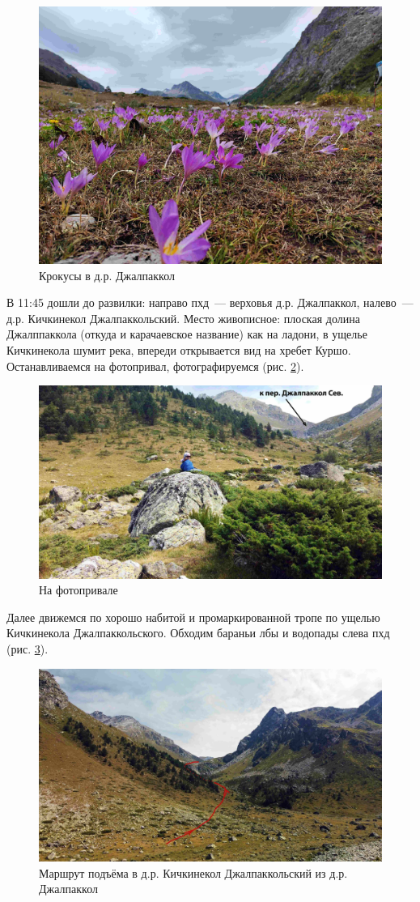 \begin{figure}[h!]
	\centering
	\includegraphics[width=0.7\linewidth]{../pics/IMG_20240822_101505}
	\caption{Крокусы в д.р. Джалпаккол}
	\label{fig:IMG_20240822_101505}
\end{figure}

В 11:45 дошли до развилки: направо пхд~--- верховья д.р. Джалпаккол, налево~--- д.р. Кичкинекол Джалпаккольский. Место живописное: плоская долина Джалппаккола (откуда и карачаевское название) как на ладони, в ущелье Кичкинекола шумит река, впереди открывается вид на хребет Куршо. Останавливаемся на фотопривал, фотографируемся (рис. \ref{fig:DJI_0830}).

\begin{figure}[h!]
	\centering
	\includegraphics[width=0.7\linewidth]{../pics/DJI_0830}
	\caption{На фотопривале}
	\label{fig:DJI_0830}
\end{figure}

Далее движемся по хорошо набитой и промаркированной тропе по ущелью Кичкинекола Джалпаккольского. Обходим бараньи лбы и водопады слева пхд (рис. \ref{fig:DJI_0835}).


\begin{figure}[h!]
	\centering
	\includegraphics[width=0.7\linewidth]{../pics/DJI_0835}
	\caption{Маршрут подъёма в д.р. Кичкинекол Джалпаккольский из д.р. Джалпаккол}
	\label{fig:DJI_0835}
\end{figure}

